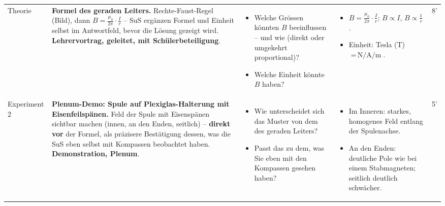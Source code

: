 \documentclass[11pt,a4paper]{article}
\newcommand{\Methode}[1]{{\small\color{groupteal}\textbf{#1}}}
\begin{document}
\begin{xltabular}{\textwidth}{@{}Y{2.1cm} Y{6.6cm} Y{6.6cm} Y{6.6cm} p{1.1cm}@{}}
Theorie &
\textbf{Formel des geraden Leiters.} Rechte-Faust-Regel (Bild), dann
$B=\frac{\mu_0}{2\pi}\cdot\frac{I}{r}$ -- SuS ergänzen Formel und Einheit
selbst im Antwortfeld, bevor die Lösung gezeigt wird.
\Methode{Lehrervortrag, geleitet, mit Schülerbeteiligung}. &
\begin{itemize}
  \item Welche Grössen könnten $B$ beeinflussen -- und wie (direkt oder
  umgekehrt proportional)?
  \item Welche Einheit könnte $B$ haben?
\end{itemize} &
\begin{itemize}
  \item $B=\frac{\mu_0}{2\pi}\cdot\frac{I}{r}$; $B\propto I$,
  $B\propto\frac1r$.
  \item Einheit: Tesla (T) $=\,\si{\newton\per\ampere\per\meter}$.
\end{itemize} &
8' \\[0.6em]

Experiment 2 &
\textbf{Plenum-Demo: Spule auf Plexiglas-Halterung mit
Eisenfeilspänen.} Feld der Spule mit Eisenspänen sichtbar machen (innen,
an den Enden, seitlich) -- \textbf{direkt vor} der Formel, als präzisere
Bestätigung dessen, was die SuS eben selbst mit Kompassen beobachtet
haben. \Methode{Demonstration, Plenum}. &
\begin{itemize}
  \item Wie unterscheidet sich das Muster von dem des geraden Leiters?
  \item Passt das zu dem, was Sie eben mit den Kompassen gesehen haben?
\end{itemize} &
\begin{itemize}
  \item Im Inneren: starkes, homogenes Feld entlang der Spulenachse.
  \item An den Enden: deutliche Pole wie bei einem Stabmagneten; seitlich
  deutlich schwächer.
\end{itemize} &
5' \\[0.6em]


\end{xltabular}
\end{document}
